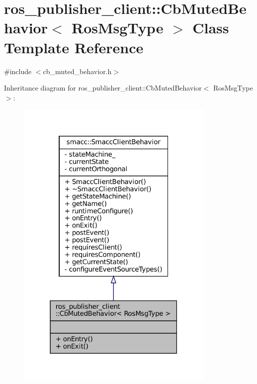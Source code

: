 \hypertarget{classros__publisher__client_1_1CbMutedBehavior}{}\section{ros\+\_\+publisher\+\_\+client\+:\+:Cb\+Muted\+Behavior$<$ Ros\+Msg\+Type $>$ Class Template Reference}
\label{classros__publisher__client_1_1CbMutedBehavior}


{\ttfamily \#include $<$cb\+\_\+muted\+\_\+behavior.\+h$>$}



Inheritance diagram for ros\+\_\+publisher\+\_\+client\+:\+:Cb\+Muted\+Behavior$<$ Ros\+Msg\+Type $>$\+:
\nopagebreak
\begin{figure}[H]
\begin{center}
\leavevmode
\includegraphics[width=271pt]{classros__publisher__client_1_1CbMutedBehavior__inherit__graph}
\end{center}
\end{figure}


